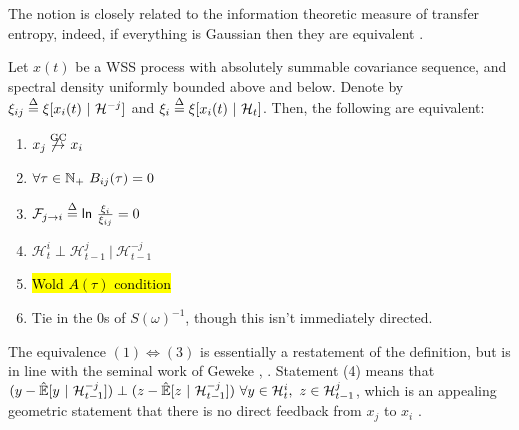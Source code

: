 \documentclass[12pt]{article}
\def\gc{\overset{\text{GC}}{\rightarrow}}  %
\def\H{\mathcal{H}}  %
\newcommand{\linE}[2]{\hat{\E}[#1\ |\ #2]}  %
\newcommand{\linEerr}[2]{\xi[#1\ |\ #2]}  %
\begin{document}
The notion is closely related to the information theoretic measure of
transfer entropy, indeed, if everything is Gaussian then they are
equivalent \cite{barnett2009granger}.

\begin{theorem}
  \label{thm:granger_causality_equivalences}
  Let $x(t)$ be a WSS process with absolutely summable covariance
  sequence, and spectral density uniformly bounded above and below.  Denote by
  $\xi_{ij} \defeq \linEerr{x_i(t)}{\H^{-j}}$ and
  $\xi_i \defeq \linEerr{x_i(t)}{\H_t}$.  Then, the following are equivalent:

  \begin{enumerate}
    \item{$x_j \not\gc x_i$}
    \item{$\forall \tau \in \N_+\ B_{ij}(\tau) = 0$}
    \item{$\mathcal{F}_{j \rightarrow i} \overset{\Delta}{=} \mathsf{ln\ }\frac{\xi_i}{\xi_{ij}} = 0$}
    \item{$\H_t^{i} \perp \H_{t - 1}^{j}\ |\ \H_{t - 1}^{-j}$}
    \item{\hl{Wold $A(\tau)$ condition}}
    \item{Tie in the 0s of $S(\omega)^{-1}$, though this isn't immediately directed.}
  \end{enumerate}
\end{theorem}

The equivalence $(1) \iff (3)$ is essentially a restatement of the
definition, but is in line with the seminal work of Geweke
\cite{geweke1982measurement}, \cite{geweke1984}.  Statement (4) means that
$(y - \linE{y}{\H_{t - 1}^{-j}}) \perp (z -
\linE{z}{\H_{t - 1}^{-j}})\ \forall y \in \H_t^i,\ z \in
\H_{t - 1}^j$, which is an appealing geometric statement that
there is no direct feedback from $x_j$ to $x_i$ \cite{lindquist}.
\end{document}
